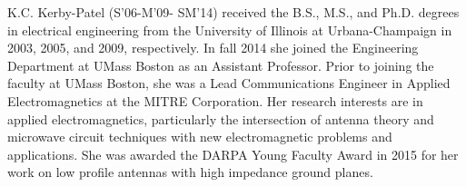 \documentclass[article]{IEEEtran}
\begin{document}
\begin{IEEEbiography}
{K.C. Kerby-Patel} (S’06-M’09- SM’14) received the B.S., M.S., and Ph.D. degrees in electrical engineering from the University of Illinois at Urbana-Champaign in 2003, 2005, and 2009, respectively. In fall 2014 she joined the Engineering Department at UMass Boston as an Assistant Professor. Prior to joining the faculty at UMass Boston, she was a Lead Communications Engineer in Applied Electromagnetics at the MITRE Corporation. Her research interests are in applied electromagnetics, particularly the intersection of antenna theory and microwave circuit techniques with new electromagnetic problems and applications. She was awarded the DARPA Young Faculty Award in 2015 for her work on low profile antennas with high impedance ground planes.
\end{IEEEbiography}
\end{document}

